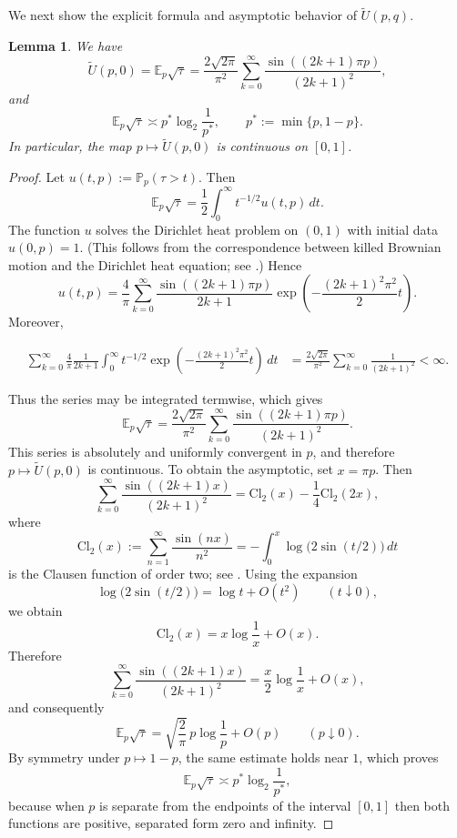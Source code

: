 \documentclass[11pt]{amsart}
\newtheorem{lemma}[theorem]{Lemma}
\theoremstyle{definition}
\renewcommand{\1}{{\mathbbm{1}}}
\begin{document}
We next show the explicit formula and asymptotic behavior of $\tilde U(p,q)$.
\begin{lemma}\label{lem:Utilde-asymptotic-S2}
We have
\begin{equation}
\label{eq:U-exten-sin}
\tilde U(p,0)=\mathbb E_p\sqrt{\tau}
=
\frac{2\sqrt{2\pi}}{\pi^2}\sum_{k=0}^\infty
\frac{\sin((2k+1)\pi p)}{(2k+1)^2},
\end{equation}
and
\[
\mathbb E_p\sqrt{\tau}\asymp p^*\log_2\frac1{p^*},
\qquad p^*:=\min\{p,1-p\}.
\]
In particular, the map $p\mapsto \tilde U(p,0)$ is continuous on $[0,1]$.
\end{lemma}

\begin{proof}
Let
$
u(t,p):=\mathbb P_p(\tau>t).
$
Then
\[
\mathbb E_p\sqrt{\tau}
=
\frac12\int_0^\infty t^{-1/2}u(t,p)\,dt.
\]
The function $u$ solves the Dirichlet heat problem on $(0,1)$ with initial data $u(0,p)=1$.
(This follows from the correspondence between killed Brownian motion and the Dirichlet heat equation; see \cite[Theorem 7.44 and Theorem 7.45,]{MortersPeresBM}.)
Hence
\[
u(t,p)=\frac4\pi\sum_{k=0}^\infty \frac{\sin((2k+1)\pi p)}{2k+1}
\exp\!\left(-\frac{(2k+1)^2\pi^2}{2}t\right).
\]
Moreover,
\begin{small}
    \begin{align*}
\sum_{k=0}^\infty \frac4\pi \frac{1}{2k+1}
\int_0^\infty t^{-1/2}
\exp\!\left(-\frac{(2k+1)^2\pi^2}{2}t\right)\,dt
&=
\frac{2\sqrt{2\pi}}{\pi^2}
\sum_{k=0}^\infty \frac{1}{(2k+1)^2}
<\infty.
\end{align*}
\end{small}
Thus the series may be integrated termwise, which gives
\[
\mathbb E_p\sqrt{\tau}
=
\frac{2\sqrt{2\pi}}{\pi^2}\sum_{k=0}^\infty
\frac{\sin((2k+1)\pi p)}{(2k+1)^2}.
\]
This series is absolutely and uniformly convergent in $p$, and therefore $p\mapsto \tilde U(p,0)$ is continuous.
To obtain the asymptotic, set $x=\pi p$. Then
\begin{equation}
\label{eq:S(p)-rep}
\sum_{k=0}^\infty \frac{\sin((2k+1)x)}{(2k+1)^2}
=
\mathrm{Cl}_2(x)-\frac14\mathrm{Cl}_2(2x),
\end{equation}
where
\begin{equation}
\label{eq:cl2}
\mathrm{Cl}_2(x):=\sum_{n=1}^\infty \frac{\sin(nx)}{n^2}
=-\int_0^x \log\!\bigl(2\sin(t/2)\bigr)\,dt
\end{equation}
is the Clausen function of order two; see \cite{Lewin1981}.
Using the expansion
\[
\log\!\bigl(2\sin(t/2)\bigr)=\log t+O(t^2)
\qquad (t\downarrow0),
\]
we obtain
\[
\mathrm{Cl}_2(x)=x\log\frac1x+O(x).
\]
Therefore
\begin{equation}
\label{eq:S(p)-approx}
\sum_{k=0}^\infty \frac{\sin((2k+1)x)}{(2k+1)^2}
=
\frac{x}{2}\log\frac1x+O(x),
\end{equation}
and consequently
\[
\mathbb E_p\sqrt{\tau}
=
\sqrt{\frac2\pi}\,p\log\frac1p+O(p)
\qquad (p\downarrow0).
\]
By symmetry under $p\mapsto1-p$, the same estimate holds near $1$, which proves
\[
\mathbb E_p\sqrt{\tau}\asymp p^*\log_2\frac1{p^*},
\]
because when $p$ is separate from the endpoints of the interval $[0,1]$ then both functions are positive,  separated form zero and infinity. 
\end{proof}
\end{document}
